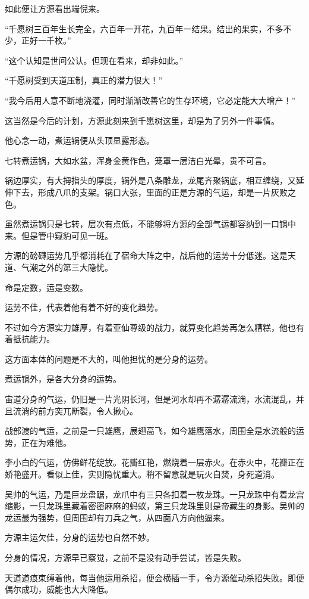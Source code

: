\begin{this_body}
如此便让方源看出端倪来。

“千愿树三百年生长完全，六百年一开花，九百年一结果。结出的果实，不多不少，正好一千枚。”

“这个认知是世间公认。但现在看来，却非如此。”

“千愿树受到天道压制，真正的潜力很大！”

“我今后用人意不断地浇灌，同时渐渐改善它的生存环境，它必定能大大增产！”

这当然是今后的计划，方源此刻来到千愿树这里，却是为了另外一件事情。

他心念一动，煮运锅便从头顶显露形态。

七转煮运锅，大如水盆，浑身金黄作色，笼罩一层洁白光晕，贵不可言。

锅边厚实，有大拇指头的厚度，锅外是八条雕龙，龙尾齐聚锅底，相互缠绕，又延伸下去，形成八爪的支架。锅口大张，里面的正是方源的气运，却是一片灰败之色。

虽然煮运锅只是七转，层次有点低，不能够将方源的全部气运都容纳到一口锅中来。但是管中窥豹可见一斑。

方源的磅礴运势几乎都消耗在了宿命大阵之中，战后他的运势十分低迷。这是天道、气潮之外的第三大隐忧。

命是定数，运是变数。

运势不佳，代表着他有着不好的变化趋势。

不过如今方源实力雄厚，有着亚仙尊级的战力，就算变化趋势再怎么糟糕，他也有着抵抗能力。

这方面本体的问题是不大的，叫他担忧的是分身的运势。

煮运锅外，是各大分身的运势。

宙道分身的气运，仍旧是一片光阴长河，但是河水却再不潺潺流淌，水流混乱，并且流淌的前方突兀断裂，令人揪心。

战部渡的气运，之前是一只雄鹰，展翅高飞，如今雄鹰落水，周围全是水流般的运势，正在为难他。

李小白的气运，仿佛鲜花绽放。花瓣红艳，燃烧着一层赤火。在赤火中，花瓣正在娇艳盛开。看似上佳，实则隐忧重大。稍不留意就是玩火自焚，身死道消。

吴帅的气运，乃是巨龙盘踞，龙爪中有三只各扣着一枚龙珠。一只龙珠中有着龙宫缩影，一只龙珠里藏着密密麻麻的蚂蚁，第三只龙珠里则是帝藏生的身影。吴帅的龙运最为强势，但周围却有刀兵之气，从四面八方向他逼来。

方源主运欠佳，分身的运势也自然不妙。

分身的情况，方源早已察觉，之前不是没有动手尝试，皆是失败。

天道道痕束缚着他，每当他运用杀招，便会横插一手，令方源催动杀招失败。即便偶尔成功，威能也大大降低。


\end{this_body}
